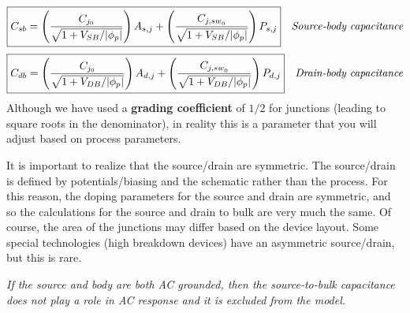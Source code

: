     \begin{align}
        \Aboxed{C_{sb} &= \left( \frac{C_{j_0}}{\sqrt{ 1 + V_{SB}/|\phi_{p}|}} \right)A_{s,j}
                    + \left( \frac{C_{{j,sw}_0}}{\sqrt{ 1 + V_{SB}/|\phi_p|}} \right)P_{s,j}}
        & \textit{Source-body capacitance}
    \end{align}
    \begin{align}
        \Aboxed{C_{db} &= \left( \frac{C_{j_0}}{\sqrt{ 1 + V_{DB}/|\phi_{p}|}}\right)A_{d,j}
                    + \left( \frac{C_{{j,sw}_0}}{\sqrt{ 1 + V_{DB}/|\phi_p|}} \right)P_{d,j}}
        & \textit{Drain-body capacitance}
    \end{align}
Although we have used a \textbf{grading coefficient} of $1/2$ for junctions (leading to square roots in the denominator), in reality this is a parameter that you will adjust based on process parameters.

It is important to realize that the source/drain are symmetric.  The source/drain is defined by potentials/biasing and the schematic rather than the process. For this reason, the doping parameters for the source and drain are symmetric, and so the calculations for the source and drain to bulk are very much the same.  Of course, the area of the junctions may differ based on the device layout.	Some special technologies (high breakdown devices) have an asymmetric source/drain, but this is rare.

\textit{If the source and body are both AC grounded, then the source-to-bulk capacitance does not play a role in AC response and it is excluded from the model.}
